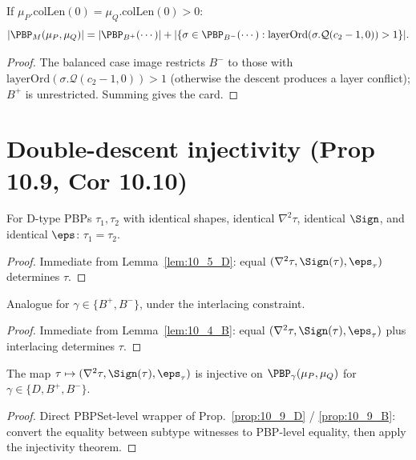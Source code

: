\begin{proposition}
  \label{prop:10_8_M_bal}
  \leanok
  If $\mu_P.\mathrm{colLen}(0) = \mu_Q.\mathrm{colLen}(0) > 0$:
  \[ |\PBP_M(\mu_P, \mu_Q)| = |\PBP_{B^+}(\cdots)| + |\{\sigma \in \PBP_{B^-}(\cdots) : \mathrm{layerOrd}(\sigma.\mathcal{Q}(c_2 - 1, 0)) > 1\}|. \]
\end{proposition}
\begin{proof}
  \leanok
  The balanced case image restricts $B^-$ to those with $\mathrm{layerOrd}(\sigma.\mathcal{Q}(c_2 - 1, 0)) > 1$ (otherwise the descent produces a layer conflict); $B^+$ is unrestricted. Summing gives the card.
\end{proof}


\chapter{Double-descent injectivity (Prop 10.9, Cor 10.10)}
\label{chap:ddescent}

\begin{proposition}
  \label{prop:10_9_D}
  \leanok
  For D-type PBPs $\tau_1, \tau_2$ with identical shapes, identical $\nabla^2\tau$, identical $\Sign$, and identical $\eps$: $\tau_1 = \tau_2$.
\end{proposition}
\begin{proof}
  \leanok
  Immediate from Lemma~\ref{lem:10_5_D}: equal $(\nabla^2\tau, \Sign(\tau), \eps_\tau)$ determines $\tau$.
\end{proof}


\begin{proposition}
  \label{prop:10_9_B}
  \leanok
  Analogue for $\gamma \in \{B^+, B^-\}$, under the interlacing constraint.
\end{proposition}
\begin{proof}
  \leanok
  Immediate from Lemma~\ref{lem:10_4_B}: equal $(\nabla^2\tau, \Sign(\tau), \eps_\tau)$ plus interlacing determines $\tau$.
\end{proof}


\begin{corollary}
  \label{cor:10_10}
  \leanok
  The map $\tau \mapsto (\nabla^2\tau, \Sign(\tau), \eps_\tau)$ is injective on $\PBP_\gamma(\mu_P, \mu_Q)$ for $\gamma \in \{D, B^+, B^-\}$.
\end{corollary}
\begin{proof}
  \leanok
  Direct PBPSet-level wrapper of Prop.~\ref{prop:10_9_D} / \ref{prop:10_9_B}: convert the equality between subtype witnesses to PBP-level equality, then apply the injectivity theorem.
\end{proof}



